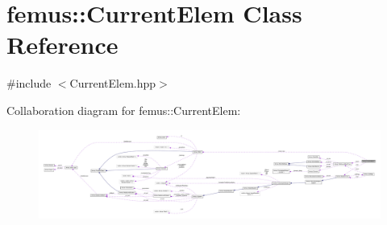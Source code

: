 \hypertarget{classfemus_1_1_current_elem}{}\section{femus\+:\+:Current\+Elem Class Reference}
\label{classfemus_1_1_current_elem}


{\ttfamily \#include $<$Current\+Elem.\+hpp$>$}



Collaboration diagram for femus\+:\+:Current\+Elem\+:
\nopagebreak
\begin{figure}[H]
\begin{center}
\leavevmode
\includegraphics[width=350pt]{classfemus_1_1_current_elem__coll__graph}
\end{center}
\end{figure}

